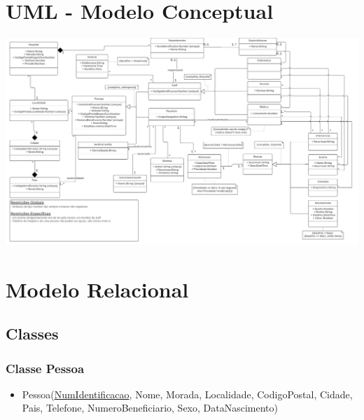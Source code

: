 \documentclass[article, a4paper, 12pt, oneside]{memoir}
\begin{document}
\newpage
\chapter[UML - Modelo Conceptual][UML]{UML - Modelo Conceptual} \label{\thechapter}
\hspace*{-1.3cm}\includegraphics[width=1.1\linewidth, height=1.0\linewidth]{BDAD-UML.png}

\newpage
\chapter[Modelo Relacional][Modelo Relacional]{Modelo Relacional} \label{\thechapter}

\section{Classes}
\subsection{Classe Pessoa}
\begin{itemize}
	\item Pessoa(\underline{NumIdentificacao}, Nome, Morada, Localidade, CodigoPostal, Cidade, Pais, Telefone, NumeroBeneficiario, Sexo, DataNascimento)
\end{itemize}
\end{document}
